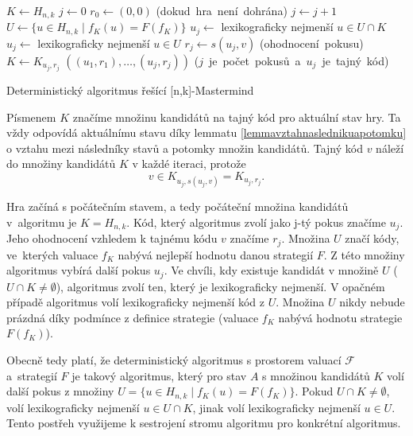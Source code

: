 \begin{algorithm}[h!]
\begin{algorithmic}[1]  %
    \State $K \gets H_{n,k}$ 
    \State $j \gets 0$
    \State $r_0 \gets (0,0)$
     \hfill \mbox{(dokud hra není dohrána)}
        \State $j \gets j + 1$ 
	\State $U \gets \{u \in H_{n,k} \mid f_K(u) = F(f_K)\}$
            \State $u_j \gets$ lexikograficky nejmenší $u \in U \cap K$
	\Else
		\State $u_j \gets$ lexikograficky nejmenší $u \in U$
	\EndIf
        \State $r_j \gets s(u_j, v)$ \hfill \mbox{(ohodnocení pokusu)}
        \State $K \gets K_{u_j,r_j}$
    \EndWhile
    \State \Return $((u_1,r_1),\dots,(u_j, r_j))$ \hfill \mbox{($j$ je počet pokusů a $u_j$ je tajný kód)}
\EndFunction
\end{algorithmic}
\caption{Deterministický algoritmus řešící [n,k]-Mastermind}
\label{alg-default}
\end{algorithm}

Písmenem $K$ značíme množinu kandidátů na tajný kód pro aktuální stav hry. Ta vždy odpovídá aktuálnímu stavu díky lemmatu \ref{lemmavztahnaslednikuapotomku} o vztahu mezi následníky stavů a potomky množin kandidátů. Tajný kód $v$ náleží do množiny kandidátů $K$ v každé iteraci, protože 
\[v \in K_{u_j, s(u_j,v)} = K_{u_j, r_j}.\]

Hra začíná s počátečním stavem, a tedy počáteční množina kandidátů v~algoritmu je $K = H_{n,k}$. Kód, který algoritmus zvolí jako j-tý pokus značíme $u_j$. Jeho ohodnocení vzhledem k tajnému kódu $v$ značíme $r_j$. Množina $U$ značí kódy, ve~kterých valuace $f_K$ nabývá nejlepší hodnotu danou strategií $F$. Z této množiny algoritmus vybírá další pokus $u_j$. Ve chvíli, kdy existuje kandidát v množině $U$ ($U\cap K \neq \emptyset$), algoritmus zvolí ten, který je lexikograficky nejmenší. V opačném případě algoritmus volí lexikograficky nejmenší kód z $U$. Množina $U$ nikdy nebude prázdná díky podmínce z definice strategie (valuace $f_K$ nabývá hodnotu strategie $F(f_K)$). 

Obecně tedy platí, že deterministický algoritmus s prostorem valuací $\mathcal{F}$ a~strategií $F$ je takový algoritmus, který pro stav $A$ s množinou kandidátů $K$ volí další pokus z množiny $U = \{u \in H_{n,k} \mid f_K(u) = F(f_K)\}$. Pokud $U \cap K \neq \emptyset$, volí lexikograficky nejmenší $u \in U \cap K$, jinak volí lexikograficky nejmenší $u \in U$. Tento postřeh využijeme k sestrojení stromu algoritmu pro konkrétní algoritmus.



